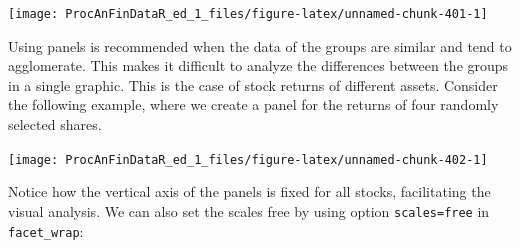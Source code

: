 \documentclass[11pt,]{book}
\newenvironment{Shaded}{\begin{snugshade}}{\end{snugshade}}
\newcommand{\KeywordTok}[1]{\textcolor[rgb]{0.27,0.27,0.27}{\textbf{#1}}}
\newcommand{\DataTypeTok}[1]{\textcolor[rgb]{0.27,0.27,0.27}{#1}}
\newcommand{\DecValTok}[1]{\textcolor[rgb]{0.06,0.06,0.06}{#1}}
\newcommand{\StringTok}[1]{\textcolor[rgb]{0.5,0.5,0.5}{#1}}
\newcommand{\CommentTok}[1]{\textcolor[rgb]{0.56,0.35,0.01}{\textit{#1}}}
\newcommand{\OperatorTok}[1]{\textcolor[rgb]{0.81,0.36,0.00}{\textbf{#1}}}
\newcommand{\NormalTok}[1]{#1}
\begin{document}
\begin{center}\texttt{[image: ProcAnFinDataR\_ed\_1\_files/figure-latex/unnamed-chunk-401-1]} \end{center}

Using panels is recommended when the data of the groups are similar and
tend to agglomerate. This makes it difficult to analyze the differences
between the groups in a single graphic. This is the case of stock
returns of different assets. Consider the following example, where we
create a panel for the returns of four randomly selected shares.

\begin{Shaded}
\end{Shaded}

\begin{center}\texttt{[image: ProcAnFinDataR\_ed\_1\_files/figure-latex/unnamed-chunk-402-1]} \end{center}

Notice how the vertical axis of the panels is fixed for all stocks,
facilitating the visual analysis. We can also set the scales free by
using option \texttt{scales=\textquotesingle{}free\textquotesingle{}} in
\texttt{facet\_wrap}:
\end{document}
